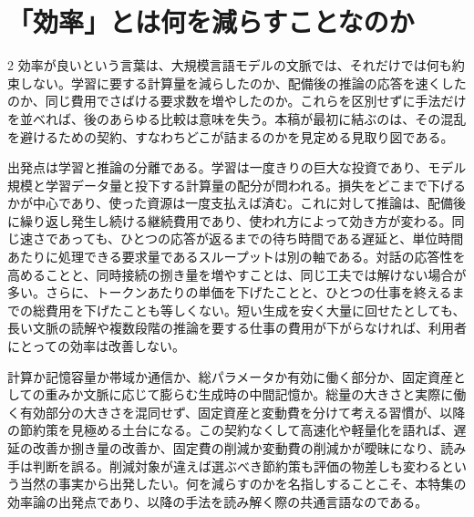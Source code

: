 \documentclass[lualatex,a4paper,10pt]{jlreq}
\begin{document}
\setcounter{tocdepth}{2}
\tableofcontents
\clearpage

\section{「効率」とは何を減らすことなのか}
\label{sec:bottleneck}

\begin{multicols}{2}
\raggedcolumns
効率が良いという言葉は、大規模言語モデルの文脈では、それだけでは何も約束しない。学習に要する計算量を減らしたのか、配備後の推論の応答を速くしたのか、同じ費用でさばける要求数を増やしたのか。これらを区別せずに手法だけを並べれば、後のあらゆる比較は意味を失う。本稿が最初に結ぶのは、その混乱を避けるための契約、すなわちどこが詰まるのかを見定める見取り図である。\autocite{kaplan2020,chinchilla,orca}

出発点は学習と推論の分離である。学習は一度きりの巨大な投資であり、モデル規模と学習データ量と投下する計算量の配分が問われる。損失をどこまで下げるかが中心であり、使った資源は一度支払えば済む。これに対して推論は、配備後に繰り返し発生し続ける継続費用であり、使われ方によって効き方が変わる。同じ速さであっても、ひとつの応答が返るまでの待ち時間である遅延と、単位時間あたりに処理できる要求量であるスループットは別の軸である。対話の応答性を高めることと、同時接続の捌き量を増やすことは、同じ工夫では解けない場合が多い。さらに、トークンあたりの単価を下げたことと、ひとつの仕事を終えるまでの総費用を下げたことも等しくない。短い生成を安く大量に回せたとしても、長い文脈の読解や複数段階の推論を要する仕事の費用が下がらなければ、利用者にとっての効率は改善しない。

計算か記憶容量か帯域か通信か、総パラメータか有効に働く部分か、固定資産としての重みか文脈に応じて膨らむ生成時の中間記憶か。総量の大きさと実際に働く有効部分の大きさを混同せず、固定資産と変動費を分けて考える習慣が、以降の節約策を見極める土台になる。この契約なくして高速化や軽量化を語れば、遅延の改善か捌き量の改善か、固定費の削減か変動費の削減かが曖昧になり、読み手は判断を誤る。削減対象が違えば選ぶべき節約策も評価の物差しも変わるという当然の事実から出発したい。何を減らすのかを名指しすることこそ、本特集の効率論の出発点であり、以降の手法を読み解く際の共通言語なのである。


\end{multicols}
\end{document}
